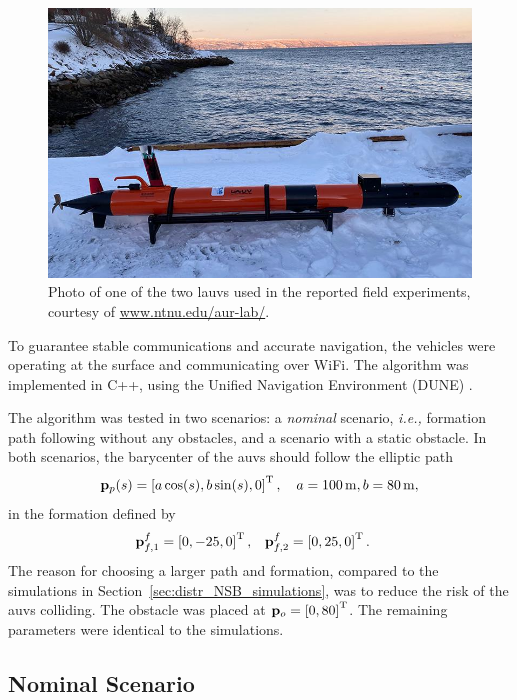 \begin{figure}[b]
    \centering
    \includegraphics[width = 0.6\columnwidth]{figures/distr_NSB/LAUV-Roald}
    \caption{Photo of one of the two \glspl{lauv} used in the reported field experiments, courtesy of \url{www.ntnu.edu/aur-lab/}.}
    \label{fig:distr_NSB_LAUV}
\end{figure}

To guarantee stable communications and accurate navigation, the vehicles were operating at the surface and communicating over WiFi.
The algorithm was implemented in C++, using the Unified Navigation Environment (DUNE) \cite{dune}.

The algorithm was tested in two scenarios: a \emph{nominal} scenario, \emph{i.e.,} formation path following without any obstacles, and a scenario with a static obstacle.
In both scenarios, the barycenter of the \glspl{auv} should follow the elliptic path
\begin{equation}
    \mathbf{p}_p(s) = \left[a \cos(s), b \sin(s), 0\right]^{\mathrm{T}}, \quad a = \SI{100}{\meter}, b = \SI{80}{\meter},
\end{equation}
in the formation defined by
\begin{align}
    \mathbf{p}_{f, 1}^f &= \left[0, -25, 0\right]^{\mathrm{T}}, &
    \mathbf{p}_{f, 2}^f &= \left[0, 25, 0\right]^{\mathrm{T}}. &
\end{align}
The reason for choosing a larger path and formation, compared to the simulations in Section~\ref{sec:distr_NSB_simulations}, was to reduce the risk of the \glspl{auv} colliding.
The obstacle was placed at $\mathbf{p}_o = \left[0, 80\right]^{\mathrm{T}}$.
The remaining parameters were identical to the simulations.

\subsection{Nominal Scenario}


